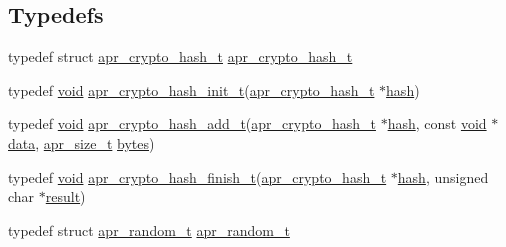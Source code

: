 \subsection*{Typedefs}
\begin{DoxyCompactItemize}
\item 
typedef struct \hyperlink{structapr__crypto__hash__t}{apr\+\_\+crypto\+\_\+hash\+\_\+t} \hyperlink{group__apr__random_ga30fbaf80424a9f1a0e9cc51072f65127}{apr\+\_\+crypto\+\_\+hash\+\_\+t}
\item 
typedef \hyperlink{group__MOD__ISAPI_gacd6cdbf73df3d9eed42fa493d9b621a6}{void} \hyperlink{group__apr__random_gad2775bc1cdb376d9dec0e97283b4bdd9}{apr\+\_\+crypto\+\_\+hash\+\_\+init\+\_\+t}(\hyperlink{structapr__crypto__hash__t}{apr\+\_\+crypto\+\_\+hash\+\_\+t} $\ast$\hyperlink{testpass_8c_adfc0cb134ace18ba7fde0fefbae7a391}{hash})
\item 
typedef \hyperlink{group__MOD__ISAPI_gacd6cdbf73df3d9eed42fa493d9b621a6}{void} \hyperlink{group__apr__random_ga2f8a4fb18078a76357327ea55936c1ea}{apr\+\_\+crypto\+\_\+hash\+\_\+add\+\_\+t}(\hyperlink{structapr__crypto__hash__t}{apr\+\_\+crypto\+\_\+hash\+\_\+t} $\ast$\hyperlink{testpass_8c_adfc0cb134ace18ba7fde0fefbae7a391}{hash}, const \hyperlink{group__MOD__ISAPI_gacd6cdbf73df3d9eed42fa493d9b621a6}{void} $\ast$\hyperlink{structdata}{data}, \hyperlink{group__apr__platform_gaaa72b2253f6f3032cefea5712a27540e}{apr\+\_\+size\+\_\+t} \hyperlink{group__apr__random_ga393b167dab644f408202cbbcad070e6d}{bytes})
\item 
typedef \hyperlink{group__MOD__ISAPI_gacd6cdbf73df3d9eed42fa493d9b621a6}{void} \hyperlink{group__apr__random_gab70ea9133870efdb5532d20d4bcf7442}{apr\+\_\+crypto\+\_\+hash\+\_\+finish\+\_\+t}(\hyperlink{structapr__crypto__hash__t}{apr\+\_\+crypto\+\_\+hash\+\_\+t} $\ast$\hyperlink{testpass_8c_adfc0cb134ace18ba7fde0fefbae7a391}{hash}, unsigned char $\ast$\hyperlink{pcretest_8txt_ada864abbb1600264b4da826e87c60355}{result})
\item 
typedef struct \hyperlink{structapr__random__t}{apr\+\_\+random\+\_\+t} \hyperlink{group__apr__random_ga33073741e56b1bafe52ba58cefcbbf96}{apr\+\_\+random\+\_\+t}
\end{DoxyCompactItemize}
